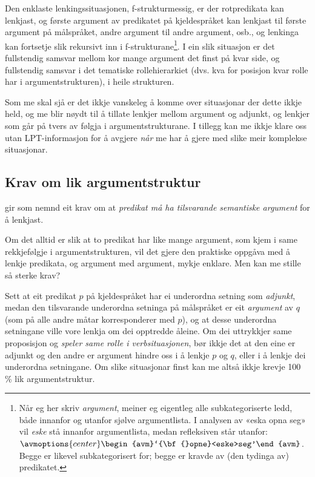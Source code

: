 \documentclass[12pt,a4paper,oneside,draft]{report}
\begin{document}
Den enklaste lenkingssituasjonen, f\hyp{}strukturmessig, er der
rotpredikata kan lenkjast, og første argument av predikatet på
kjeldespråket kan lenkjast til første argument på målspråket, andre
argument til andre argument, osb., og lenkinga kan fortsetje slik
rekursivt inn i f\hyp{}strukturane\footnote{Når eg her skriv \emph{argument}, meiner eg eigentleg alle
        subkategoriserte ledd, både innanfor og utanfor sjølve
        argumentlista. I analysen av «eska opna seg» vil \emph{eske} stå
        innanfor argumentlista, medan refleksiven står utanfor:
        ${\avmoptions{center}\begin{avm}`{\bf{}opne}<eske>seg'\end{avm}}$.
        Begge er likevel subkategorisert for; begge er kravde av (den
        tydinga av) predikatet. }. I ein slik situasjon er det fullstendig
samsvar mellom kor mange argument det finst på kvar side, og
fullstendig samsvar i det tematiske rollehierarkiet (dvs. kva for
posisjon kvar rolle har i argumentstrukturen), i heile strukturen.

Som me skal sjå er det ikkje vanskeleg å komme over situasjonar der
dette ikkje held, og me blir nøydt til å tillate lenkjer mellom
argument og adjunkt, og lenkjer som går på tvers av følgja i
argumentstrukturane. I tillegg kan me ikkje klare oss utan
LPT\hyp{}informasjon for å avgjere \emph{når} me har å gjere med slike meir
komplekse situasjonar. 
\subsection{Krav om lik argumentstruktur}
\label{sec-3.6.1}

\label{SEC:lik-argstr}

\citet{thunes2003eal} gir som nemnd eit krav om at \emph{predikat må ha tilsvarande semantiske argument} for å lenkjast.

Om det alltid er slik at to predikat har like mange argument, som kjem i
same rekkjefølgje i argumentstrukturen, vil det gjere den praktiske
oppgåva med å lenkje predikata, og argument med argument, mykje
enklare. Men kan me stille så sterke krav?

Sett at eit predikat $p$ på kjeldespråket har ei underordna setning
 som \emph{adjunkt}, medan den tilsvarande underordna setninga på
 målspråket er eit \emph{argument} av $q$ (som på alle andre måtar
 korresponderer med $p$), og at desse underordna setningane ville vore
 lenkja om dei opptredde åleine. Om dei uttrykkjer same proposisjon og
 \emph{speler same rolle i verbsituasjonen}, bør ikkje det at den eine
 er adjunkt og den andre er argument hindre oss i å lenkje $p$ og $q$,
 eller i å lenkje dei underordna setningane. Om slike situasjonar
 finst kan me altså ikkje krevje 100 \% lik argumentstruktur.
\end{document}

